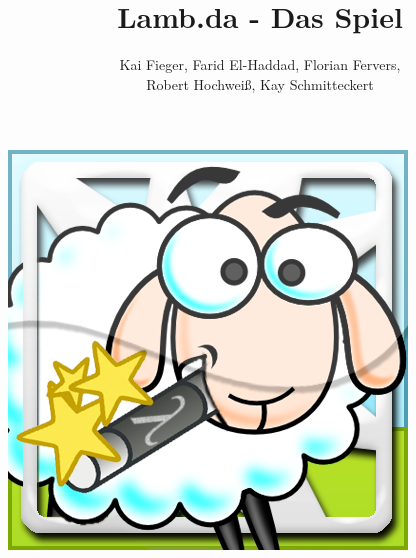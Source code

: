 \documentclass[parskip=full]{scrartcl}
\title{Lamb.da - Das Spiel}
\author{ 	
Kai Fieger, Farid El-Haddad,  Florian Fervers,
\\
Robert Hochweiß,  Kay Schmitteckert
}
\begin{document}
\maketitle
	\begin{center}
	\includegraphics[width=300pt]{../GUI-Entwurf/icon.png}
	\end{center}
	
\newpage
\tableofcontents
\newpage

\newpage

\newpage

\newpage

\newpage

\newpage

\newpage

\newpage

\newpage

\newpage

\newpage

\newpage

\end{document}
